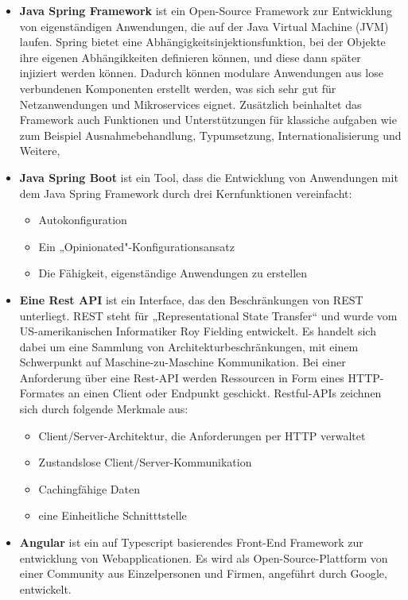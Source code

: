 \begin{itemize}
 \item \textbf{Java Spring Framework} ist ein Open-Source Framework zur Entwicklung von eigenständigen Anwendungen, die auf der Java Virtual Machine (JVM) laufen. Spring bietet eine Abhängigkeitsinjektionsfunktion, bei der Objekte ihre eigenen Abhängikkeiten definieren können, und diese dann später injiziert werden können. Dadurch können modulare Anwendungen aus lose verbundenen Komponenten erstellt werden, was sich sehr gut für Netzanwendungen und Mikroservices eignet. Zusätzlich beinhaltet das Framework auch Funktionen und Unterstützungen für klassiche aufgaben wie zum Beispiel Ausnahmebehandlung, Typumsetzung, Internationalisierung und Weitere,
 \item \textbf{Java Spring Boot} ist ein Tool, dass die Entwicklung von Anwendungen mit dem Java Spring Framework durch drei Kernfunktionen vereinfacht:
    \begin{itemize}
        \item Autokonfiguration
        \item Ein „Opinionated"-Konfigurationsansatz
        \item Die Fähigkeit, eigenständige Anwendungen zu erstellen
    \end{itemize}
 \item \textbf{Eine Rest API} ist ein Interface, das den Beschränkungen von REST unterliegt. REST steht für „Representational State Transfer“ und wurde vom US-amerikanischen Informatiker Roy Fielding entwickelt. Es handelt sich dabei um eine Sammlung von Architekturbeschränkungen, mit einem Schwerpunkt auf Maschine-zu-Maschine Kommunikation. Bei einer Anforderung über eine Rest-API werden Ressourcen in Form eines HTTP-Formates an einen Client oder Endpunkt geschickt.
 Restful-APIs zeichnen sich durch folgende Merkmale aus:
 \begin{itemize}
     \item Client/Server-Architektur, die Anforderungen per HTTP verwaltet
     \item Zustandslose Client/Server-Kommunikation
     \item Cachingfähige Daten
     \item eine Einheitliche Schnitttstelle
 \end{itemize}
 \item \textbf{Angular} ist ein auf Typescript basierendes Front-End Framework zur entwicklung von Webapplicationen. Es wird als Open-Source-Plattform von einer Community aus Einzelpersonen und Firmen, angeführt durch Google, entwickelt.

\end{itemize}
